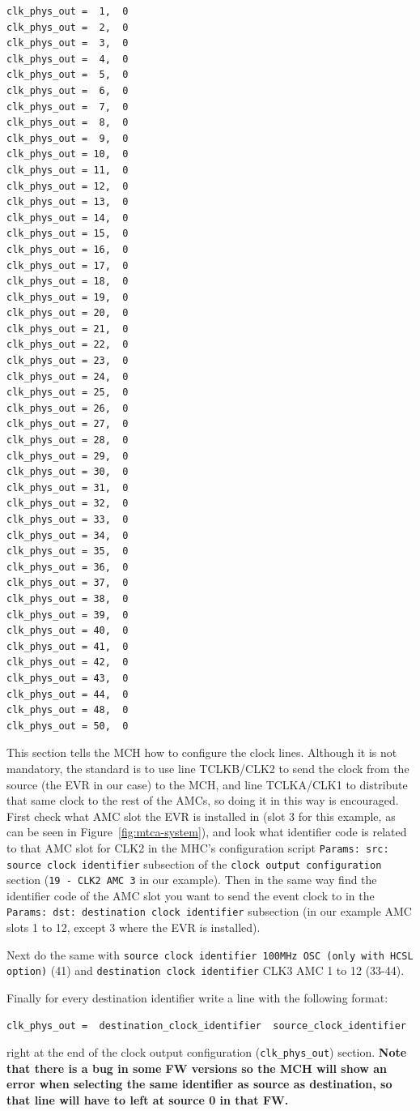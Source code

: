 \documentclass[11pt
  , a4paper
  , article
  , oneside
  , showtrims
]{memoir}
\begin{document}
\begin{lstlisting}[style=termstyle]
clk_phys_out =  1,  0
clk_phys_out =  2,  0
clk_phys_out =  3,  0
clk_phys_out =  4,  0
clk_phys_out =  5,  0
clk_phys_out =  6,  0
clk_phys_out =  7,  0
clk_phys_out =  8,  0
clk_phys_out =  9,  0
clk_phys_out = 10,  0
clk_phys_out = 11,  0
clk_phys_out = 12,  0
clk_phys_out = 13,  0
clk_phys_out = 14,  0
clk_phys_out = 15,  0
clk_phys_out = 16,  0
clk_phys_out = 17,  0
clk_phys_out = 18,  0
clk_phys_out = 19,  0
clk_phys_out = 20,  0
clk_phys_out = 21,  0
clk_phys_out = 22,  0
clk_phys_out = 23,  0
clk_phys_out = 24,  0
clk_phys_out = 25,  0
clk_phys_out = 26,  0
clk_phys_out = 27,  0
clk_phys_out = 28,  0
clk_phys_out = 29,  0
clk_phys_out = 30,  0
clk_phys_out = 31,  0
clk_phys_out = 32,  0
clk_phys_out = 33,  0
clk_phys_out = 34,  0
clk_phys_out = 35,  0
clk_phys_out = 36,  0
clk_phys_out = 37,  0
clk_phys_out = 38,  0
clk_phys_out = 39,  0
clk_phys_out = 40,  0
clk_phys_out = 41,  0
clk_phys_out = 42,  0
clk_phys_out = 43,  0
clk_phys_out = 44,  0
clk_phys_out = 48,  0
clk_phys_out = 50,  0

\end{lstlisting}

This section tells the MCH how to configure the clock lines. Although it is not mandatory, the standard is to use line TCLKB/CLK2 to send the clock from the source (the EVR in our case) to the MCH, and line TCLKA/CLK1 to distribute that same clock to the rest of the AMCs, so doing it in this way is encouraged. First check what AMC slot the EVR is installed in (slot 3 for this example, as can be seen in Figure~\ref{fig:mtca-system}), and look what identifier code is related to that AMC slot for CLK2 in the MHC's configuration script \texttt{Params: src: source clock identifier} subsection of the \texttt{clock output configuration} section (\texttt{19 -  CLK2 AMC  3} in our example). Then in the same way find the identifier code of the AMC slot you want to send the event clock to in the \texttt{Params: dst: destination clock identifier} subsection (in our example AMC slots 1 to 12, except 3 where the EVR is installed).

Next do the same with \texttt{source clock identifier 100MHz OSC (only with HCSL option)} (41) and \texttt{destination clock identifier} CLK3 AMC 1 to 12 (33-44).

Finally for every destination identifier write a line with the following format:
\begin{lstlisting}[style=termstyle]
clk_phys_out =  destination_clock_identifier  source_clock_identifier
\end{lstlisting}
right at the end of the clock output configuration (\texttt{clk\_phys\_out}) section. \textbf{Note that there is a bug in some FW versions so the MCH will show an error when selecting the same identifier as source as destination, so that line will have to left at source 0 in that FW.}
\end{document}
